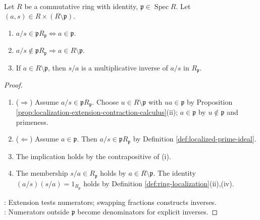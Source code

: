 \begin{proposition} \label{prop:prime-localization-element-criterion}
\\
Let $R$ be a commutative ring with identity, $\mathfrak{p}\in\operatorname{Spec}R$. Let $(a,s)\in R\times(R\setminus\mathfrak{p})$.
\begin{enumerate}[label=(\roman*)]
\setlength{\itemsep}{0pt}
\item $a/s\in\mathfrak{p}R_{\mathfrak{p}}\Longleftrightarrow a\in\mathfrak{p}$.
\item $a/s\notin\mathfrak{p}R_{\mathfrak{p}}\Longrightarrow a\in R\setminus\mathfrak{p}$.
\item If $a\in R\setminus\mathfrak{p}$, then $s/a$ is a multiplicative inverse of $a/s$ in $R_{\mathfrak{p}}$.
\end{enumerate}
\begin{proof}
\begin{enumerate}[label=(\roman*)]
\setlength{\itemsep}{0pt}
\item[$(i)$] ($\Rightarrow$) Assume $a/s\in\mathfrak{p}R_{\mathfrak{p}}$. Choose $u\in R\setminus\mathfrak{p}$ with $ua\in\mathfrak{p}$ by Proposition \ref{prop:localization-extension-contraction-calculus}(ii);  $a\in\mathfrak{p}$ by $u\notin\mathfrak{p}$ and primeness.
\item[$(i)$] ($\Leftarrow$) Assume $a\in\mathfrak{p}$. Then $a/s\in\mathfrak{p}R_{\mathfrak{p}}$ by Definition \ref{def:localized-prime-ideal}.
\item[$(ii)$] The implication holds by the contrapositive of (i).
\item[$(iii)$] The membership $s/a\in R_{\mathfrak{p}}$ holds by $a\in R\setminus\mathfrak{p}$. The identity $(a/s)(s/a)=1_{R_{\mathfrak{p}}}$ holds by Definition \ref{def:ring-localization}(ii),(iv).
\end{enumerate}
: Extension tests numerators; swapping fractions constructs inverses.\\
: Numerators outside $\mathfrak{p}$ become denominators for explicit inverses.
\end{proof}
\end{proposition}

